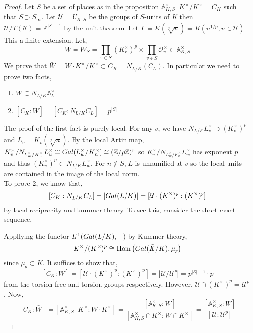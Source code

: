 \documentclass[12pt]{extarticle}
\newcommand{\Z}{\mathbb{Z}}
\newcommand{\galgroup}[1]{Gal \small(#1 \small)}
\newcommand{\ints}[1]{\mathcal{O}_{#1}}
\newcommand{\Hom}[2]{\mathrm{Hom}\left( #1, #2 \right)}
\theoremstyle{definition}
\begin{document}
\begin{proof}
Let $S$ be a set of places as in the proposition $\mathbb{A}_{K,S}^\times \cdot K^\times / K^\times = C_K$ such that $S \supset S_{\infty}$. Let $\mathcal{U} = U_{K,S}$  be the groups of $S$-units of $K$ then $\mathcal{U}/T(\mathcal{U}) = \Z^{|S|-1}$ by the unit theorem. Let $L = K(\sqrt[p]{u}) = K(u^{1/p}, u \in \mathcal{U})$ This a finite extension. Let,
\[W = W_S = \prod_{v \in S} (K^\times_v)^p \times \prod_{v \notin S} \ints{v}^\times \subset \mathbb{A}_{K,S}^\times\]
We prove that $\bar{W} = W \cdot K^\times / K^\times \subset C_K = N_{L/K}(C_L)$. In particular we need to prove two facts,
\begin{enumerate}
\item $W \subset N_{L/K} \mathbb{A}_{L}^\times$

\item $[C_K : \bar{W} ] = [ C_K : N_{L/K} C_L ] = p^|S|$
\end{enumerate}
The proof of the first fact is purely local. For any $v$, we have $N_{L/K} L_v^\times \supset (K_v^\times)^p$ and $L_v = K_v(\sqrt[p]{u})$. By the local Artin map, $K^\times_v / N_{L_w^\times / K_v^\times} L_w^\times \cong \galgroup{L_w^\times / K_n^\times} \cong (\Z / p \Z)^r$ so $K^\times_v / N_{L_w^\times / K_v^\times} L_w^\times$ has exponent $p$ and thus $(K_v^\times)^p \subset N_{L/K} L_w^\times$. For $n \notin S$, $L$ is unramified at $v$ so the local units are contained in the image of the local norm.
\bigskip\\
To prove $2$, we know that,
\[ [C_K : N_{L/K} C_L] = |\galgroup{L/K} | = [ \mathcal{U} \cdot (K^\times)^p : (K^\times)^p ] \]
by local reciprocity and kummer theory. To see this, consider the short exact sequence,
\begin{center}
\end{center}
Appllying the functor $H^1(\galgroup{L/K}, -)$ by Kummer theory,
\[ K^\times / (K^\times)^p \cong \Hom{\galgroup{\bar{K}/K}}{\mu_p}\] since $\mu_p \subset K$. It suffices to show that, 
\[[C_K : \bar{W} ] = [ \mathcal{U} \cdot (K^\times)^p : (K^\times)^p ] = |\mathcal{U}/\mathcal{U}^p | = p^{|S| - 1} \cdot p \]
from the torsion-free and torsion groups respectively.
However, $\mathcal{U} \cap (K^\times)^p = \mathcal{U}^p$. Now, 
\[ [C_K : \bar{W}] = [ \mathbb{A}_{K,S}^\times \cdot K^\times : W \cdot K^\times ] = \frac{ [ \mathbb{A}_{K, S}^\times : W ] }{ [ \mathbb{A}_{K, S}^\times \cap K^\times : W \cap K^\times ]} = \frac{ [ \mathbb{A}_{K,S}^\times : W ] }{ [ \mathcal{U} : \mathcal{U}^p ] } \]

\end{proof}
\end{document}
